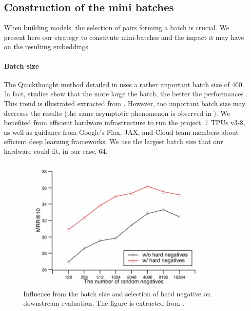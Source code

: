 \subsection{Construction of the mini batches}

When building models. the selection of pairs forming a batch is crucial. We present here our strategy to constitute mini-batches and the impact it may have on the resulting embeddings.

\paragraph{Batch size} The Quickthought method detailed in  uses a rather important batch size of 400. In fact, studies show that the more large the batch, the better the performances  \parencite{chen_20a, qu_21}. This trend is illustrated  extracted from \textcite{qu_21}. However, too important batch size may decrease the results (the same asymptotic phenomenon is observed in \textcite{chen_20a}). We benefited from efficient hardware infrastructure to run the project: 7 TPUs v3-8, as well as guidance from Google’s Flax, JAX, and Cloud team members about efficient deep learning frameworks. We use the largest batch size that our hardware could fit, in our case, 64.

\begin{figure}[htb!]
	\includegraphics[width=10cm]{images/batch-size.png}
	\caption[Batch size]{Influence from the batch size and selection of hard negative on downstream evaluation. The figure is extracted from \textcite{qu_21}.}
\end{figure}

